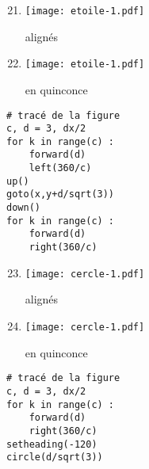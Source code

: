 \documentclass[11pt,a4paper]{article}
\begin{document}
\noindent\begin{minipage}[t]{5cm}
\begin{enumerate}\setcounter{enumi}{20}
\item \begin{minipage}{1.75cm}\texttt{[image: etoile-1.pdf]}\end{minipage} alignés
\item \begin{minipage}{1.75cm}\texttt{[image: etoile-1.pdf]}\end{minipage} en quinconce
\end{enumerate}
\end{minipage}
\hfill
\begin{minipage}[t]{7cm}\footnotesize
\begin{Verbatim}
# tracé de la figure
c, d = 3, dx/2
for k in range(c) :
    forward(d)
    left(360/c)
up()
goto(x,y+d/sqrt(3))
down()
for k in range(c) :
    forward(d)
    right(360/c)
\end{Verbatim}
\end{minipage}
\vspace*{5mm}

\noindent\begin{minipage}[t]{5cm}
\begin{enumerate}\setcounter{enumi}{22}
\item \begin{minipage}{1.75cm}\texttt{[image: cercle-1.pdf]}\end{minipage} alignés
\item \begin{minipage}{1.75cm}\texttt{[image: cercle-1.pdf]}\end{minipage} en quinconce
\end{enumerate}
\end{minipage}
\hfill
\begin{minipage}[t]{7cm}\footnotesize
\begin{Verbatim}
# tracé de la figure
c, d = 3, dx/2
for k in range(c) :
    forward(d)
    right(360/c)
setheading(-120)
circle(d/sqrt(3))
\end{Verbatim}
\end{minipage}


\end{document}
